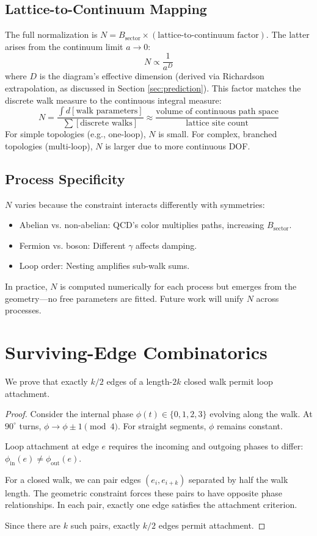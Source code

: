 \documentclass[11pt,a4paper]{article}
\theoremstyle{definition}
\theoremstyle{remark}
\begin{document}
\subsection{Lattice-to-Continuum Mapping}
The full normalization is $N = B_\text{sector} \times \left( \text{lattice-to-continuum factor} \right)$. The latter arises from the continuum limit $a \to 0$:
\[
N \propto \frac{1}{a^D}
\]
where $D$ is the diagram's effective dimension (derived via Richardson extrapolation, as discussed in Section \ref{sec:prediction}). This factor matches the discrete walk measure to the continuous integral measure:
\[
N = \frac{\int d[\text{walk parameters}]}{\sum[\text{discrete walks}]} \approx \frac{\text{volume of continuous path space}}{\text{lattice site count}}
\]
For simple topologies (e.g., one-loop), $N$ is small. For complex, branched topologies (multi-loop), $N$ is larger due to more continuous DOF.

\subsection{Process Specificity}
$N$ varies because the constraint interacts differently with symmetries:
\begin{itemize}
\item Abelian vs. non-abelian: QCD's color multiplies paths, increasing $B_\text{sector}$.
\item Fermion vs. boson: Different $\gamma$ affects damping.
\item Loop order: Nesting amplifies sub-walk sums.
\end{itemize}
In practice, $N$ is computed numerically for each process but emerges from the geometry—no free parameters are fitted. Future work will unify $N$ across processes.

\section{Surviving-Edge Combinatorics}
\label{app:edges}

We prove that exactly $k/2$ edges of a length-$2k$ closed walk permit loop attachment.

\begin{proof}
Consider the internal phase $\phi(t) \in \{0,1,2,3\}$ evolving along the walk. At $90^\circ$ turns, $\phi \to \phi \pm 1 \pmod{4}$. For straight segments, $\phi$ remains constant.

Loop attachment at edge $e$ requires the incoming and outgoing phases to differ: $\phi_{\text{in}}(e) \neq \phi_{\text{out}}(e)$. 

For a closed walk, we can pair edges $(e_i, e_{i+k})$ separated by half the walk length. The geometric constraint forces these pairs to have opposite phase relationships. In each pair, exactly one edge satisfies the attachment criterion.

Since there are $k$ such pairs, exactly $k/2$ edges permit attachment.
\end{proof}
\end{document}
